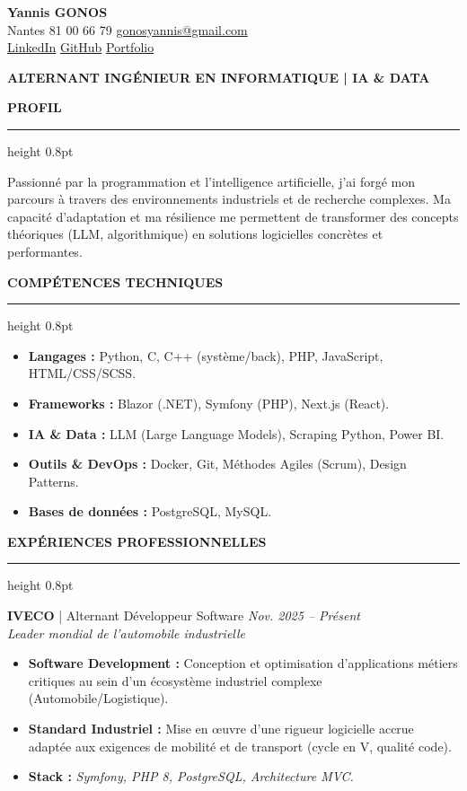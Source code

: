 \documentclass[10pt,a4paper,sans]{article}
\newcommand{\sectiontitle}[1]{%
    \vspace{6pt} %
    {\large\bfseries\color{primary}\uppercase{#1}} %
    \par\vspace{2pt}
    \hrule height 0.8pt
    \par\vspace{5pt} %
}
\newcommand{\experience}[4]{%
    \textbf{#1} | #2 \hfill \textit{#3} \\
    \textit{#4} \vspace{2pt}
}
\begin{document}
\begin{center}
    {\Huge \bfseries Yannis GONOS} \\
    \vspace{3pt}
    \small
    \faMapMarker* Nantes \quad {} 81 00 66 79 \quad \faEnvelope \href{mailto:gonosyannis@gmail.com}{gonosyannis@gmail.com} \\
    \faLinkedin \href{https://www.linkedin.com/in/yannis-gonos-49b23423a/}{LinkedIn} \quad \faGithub \href{https://github.com/GnsYnns}{GitHub} \quad \faGlobe \href{https://gnsynns.github.io/gnsynns/}{Portfolio}
\end{center}

\begin{center}
    \colorbox{primary}{\color{white} \bfseries \enskip ALTERNANT INGÉNIEUR EN INFORMATIQUE | IA \& DATA \enskip}
\end{center}

\sectiontitle{Profil}
Passionné par la programmation et l'intelligence artificielle, j'ai forgé mon parcours à travers des environnements industriels et de recherche complexes. Ma capacité d'adaptation et ma résilience me permettent de transformer des concepts théoriques (LLM, algorithmique) en solutions logicielles concrètes et performantes.

\sectiontitle{Compétences Techniques}
\begin{itemize}[leftmargin=*, label=\textbullet]
    \item \textbf{Langages :} Python, C, C++ (système/back), PHP, JavaScript, HTML/CSS/SCSS.
    \item \textbf{Frameworks :} Blazor (.NET), Symfony (PHP), Next.js (React).
    \item \textbf{IA \& Data :} LLM (Large Language Models), Scraping Python, Power BI.
    \item \textbf{Outils \& DevOps :} Docker, Git, Méthodes Agiles (Scrum), Design Patterns.
    \item \textbf{Bases de données :} PostgreSQL, MySQL.
\end{itemize}

\sectiontitle{Expériences Professionnelles}

\experience{IVECO}{Alternant Développeur Software}{Nov. 2025 -- Présent}{Leader mondial de l'automobile industrielle}
\begin{itemize}[noitemsep, topsep=2pt]
    \item \textbf{Software Development :} Conception et optimisation d'applications métiers critiques au sein d'un écosystème industriel complexe (Automobile/Logistique).
    \item \textbf{Standard Industriel :} Mise en œuvre d'une rigueur logicielle accrue adaptée aux exigences de mobilité et de transport (cycle en V, qualité code).
    \item \textbf{Stack :} \textit{Symfony, PHP 8, PostgreSQL, Architecture MVC.}
\end{itemize}
\end{document}
